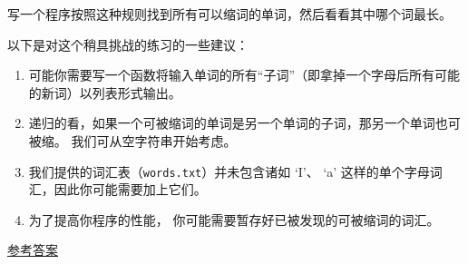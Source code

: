 \begin{exercise}

写一个程序按照这种规则找到所有可以缩词的单词，然后看看其中哪个词最长。

以下是对这个稍具挑战的练习的一些建议：

\begin{enumerate}
\item 可能你需要写一个函数将输入单词的所有``子词''（即拿掉一个字母后所有可能的新词）以列表形式输出。
 

\item 递归的看，如果一个可被缩词的单词是另一个单词的子词，那另一个单词也可被缩。 我们可从空字符串开始考虑。

\item 我们提供的词汇表（\lstinline{words.txt}）并未包含诸如 `I'、 `a' 这样的单个字母词汇，因此你可能需要加上它们。

\item 为了提高你程序的性能， 你可能需要暂存好已被发现的可被缩词的词汇。

\end{enumerate}

\href{http://thinkpython2.com/code/reducible.py}{参考答案}

\end{exercise}







